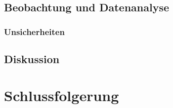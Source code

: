 \documentclass[
	a4paper,
	12pt,
	pagesize,
	ngerman
]{scrartcl}
\begin{document}
	\subsection{Beobachtung und Datenanalyse}
	\subsubsection{Unsicherheiten}

	\subsection{Diskussion}

	\section{Schlussfolgerung}

	\printbibliography
\end{document}
